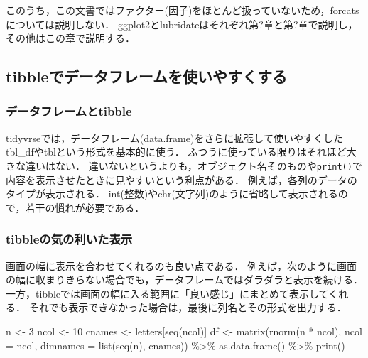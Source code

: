 \documentclass[
]{article}
\newenvironment{Shaded}{\begin{snugshade}}{\end{snugshade}}
\newcommand{\AttributeTok}[1]{\textcolor[rgb]{0.77,0.63,0.00}{#1}}
\newcommand{\DecValTok}[1]{\textcolor[rgb]{0.00,0.00,0.81}{#1}}
\newcommand{\FunctionTok}[1]{\textcolor[rgb]{0.00,0.00,0.00}{#1}}
\newcommand{\NormalTok}[1]{#1}
\newcommand{\OtherTok}[1]{\textcolor[rgb]{0.56,0.35,0.01}{#1}}
\newcommand{\SpecialCharTok}[1]{\textcolor[rgb]{0.00,0.00,0.00}{#1}}
\begin{document}
このうち，この文書ではファクター(因子)をほとんど扱っていないため，forcatsについては説明しない．
ggplot2とlubridateはそれぞれ第?章と第?章で説明し，その他はこの章で説明する．

\hypertarget{tibbleux3067ux30c7ux30fcux30bfux30d5ux30ecux30fcux30e0ux3092ux4f7fux3044ux3084ux3059ux304fux3059ux308b}{%
\subsection{tibbleでデータフレームを使いやすくする}\label{tibbleux3067ux30c7ux30fcux30bfux30d5ux30ecux30fcux30e0ux3092ux4f7fux3044ux3084ux3059ux304fux3059ux308b}}

\hypertarget{ux30c7ux30fcux30bfux30d5ux30ecux30fcux30e0ux3068tibble}{%
\subsubsection{データフレームとtibble}\label{ux30c7ux30fcux30bfux30d5ux30ecux30fcux30e0ux3068tibble}}

tidyvrseでは，データフレーム(data.frame)をさらに拡張して使いやすくした tbl\_dfやtblという形式を基本的に使う．
ふつうに使っている限りはそれほど大きな違いはない．
違いないというよりも，オブジェクト名そのものや\texttt{print()}で内容を表示させたときに見やすいという利点がある．
例えば，各列のデータのタイプが表示される．
int(整数)やchr(文字列)のように省略して表示されるので，若干の慣れが必要である．

\hypertarget{tibbleux306eux6c17ux306eux5229ux3044ux305fux8868ux793a}{%
\subsubsection{tibbleの気の利いた表示}\label{tibbleux306eux6c17ux306eux5229ux3044ux305fux8868ux793a}}

画面の幅に表示を合わせてくれるのも良い点である．
例えば，次のように画面の幅に収まりきらない場合でも，データフレームではダラダラと表示を続ける．
一方，tibbleでは画面の幅に入る範囲に「良い感じ」にまとめて表示してくれる．
それでも表示できなかった場合は，最後に列名とその形式を出力する．

\begin{Shaded}
\begin{Highlighting}[]
\NormalTok{n }\OtherTok{\textless{}{-}} \DecValTok{3}
\NormalTok{ncol }\OtherTok{\textless{}{-}} \DecValTok{10}
\NormalTok{cnames }\OtherTok{\textless{}{-}}\NormalTok{ letters[}\FunctionTok{seq}\NormalTok{(ncol)]}
\NormalTok{df }\OtherTok{\textless{}{-}} 
  \FunctionTok{matrix}\NormalTok{(}\FunctionTok{rnorm}\NormalTok{(n }\SpecialCharTok{*}\NormalTok{ ncol), }\AttributeTok{ncol =}\NormalTok{ ncol, }\AttributeTok{dimnames =} \FunctionTok{list}\NormalTok{(}\FunctionTok{seq}\NormalTok{(n), cnames)) }\SpecialCharTok{\%\textgreater{}\%}
  \FunctionTok{as.data.frame}\NormalTok{() }\SpecialCharTok{\%\textgreater{}\%}
  \FunctionTok{print}\NormalTok{()}
\end{Highlighting}
\end{Shaded}
\end{document}
